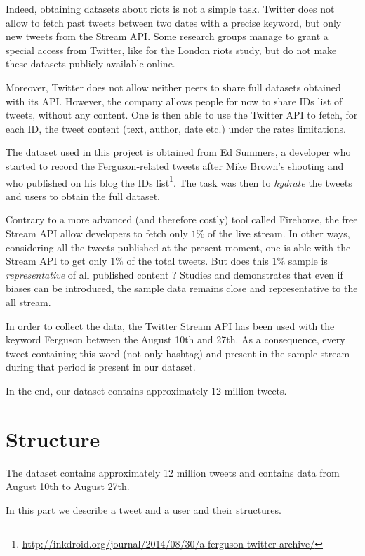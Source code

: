 \documentclass[a4paper,twoside,12pt,openright]{report}
\begin{document}
Indeed, obtaining datasets about riots is not a simple task. Twitter does not allow to fetch past tweets between two dates with a precise keyword, but only new tweets from the Stream API. Some research groups manage to grant a special access from Twitter, like for the London riots study\cite{procter2013reading}, but do not make these datasets publicly available online.

Moreover, Twitter does not allow neither peers to share full datasets obtained with its API. However, the company allows people for now to share IDs list of tweets, without any content. One is then able to use the Twitter API to fetch, for each ID, the tweet content (text, author, date etc.) under the rates limitations.

The dataset used in this project is obtained from Ed Summers, a developer who started to record the Ferguson-related tweets after Mike Brown's shooting and who published on his blog the IDs list\footnote{\url{http://inkdroid.org/journal/2014/08/30/a-ferguson-twitter-archive/}}. The task was then to \emph{hydrate} the tweets and users to obtain the full dataset.

Contrary to a more advanced (and therefore costly) tool called Firehorse, the free Stream API allow developers to fetch only $1\%$ of the live stream. In other ways, considering all the tweets published at the present moment, one is able with the Stream API to get only $1\%$ of the total tweets. But does this $1\%$ sample is \emph{representative} of all published content ? Studies \cite{DBLP:journals/corr/MorstatterPLC13} and \cite{morstatter2014biased} demonstrates that even if biases can be introduced, the sample data remains close and representative to the all stream.

In order to collect the data, the Twitter Stream API has been used with the keyword Ferguson between the August 10th and 27th. As a consequence, every tweet containing this word (not only hashtag) and present in the sample stream during that period is present in our dataset.

In the end, our dataset contains approximately 12 million tweets.

\newpage

\section{Structure}
The dataset contains approximately 12 million tweets and contains data from August 10th to August 27th.

In this part we describe a tweet and a user and their structures.
\end{document}
